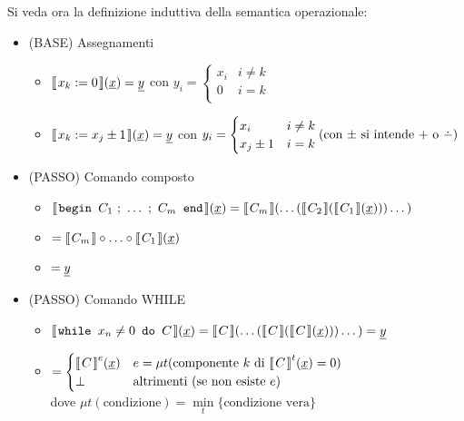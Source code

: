 Si veda ora la definizione induttiva della semantica operazionale:
\begin{itemize}
    \item (BASE) Assegnamenti
        \begin{itemize}
            \item $\opsemWHILE{x_k:=0}{\sottolinea{x}} = \sottolinea{y}$ con
                $y_i = \begin{cases}
                    x_i & i\neq k\\
                    0 & i= k\\
                \end{cases}$
            \item $\opsemWHILE{x_k:=x_j \pm 1}{\sottolinea{x}} = \sottolinea{y}$ con
                $y_i = \begin{cases}
                    x_i & i\neq k\\
                    x_j\pm 1 & i= k\\
                \end{cases} \hfill \text{(con $\pm$ si intende $+$ o $\dotminus$)}$
        \end{itemize}
    \item (PASSO) Comando composto
        \begin{itemize}
            \item $
                \opsemWHILE{\textbegin C_1 \ ; \ \dots \ ; \ C_m\textend}{\sottolinea{x}}
                = \opsemWHILE{C_m}{
                    \dots(
                        \opsemWHILE{C_2}{
                            \opsemWHILE{C_1}{\sottolinea{x}}
                        }
                    )\dots
                }$
            \item[]\hspace{14.1em}$=\opsemWHILEnoP{C_m}\circ\hdots\circ\opsemWHILEnoP{C_1}(\sottolinea{x})$
            \item[]\hspace{14.1em}$=\text{\underline{$y$}}$
        \end{itemize}
    \item (PASSO) Comando WHILE
        \begin{itemize}
            \item $
            \opsemWHILE{\while{x_n} C}{\sottolinea{x}} =
            \opsemWHILE{C}{
                \dots(
                \opsemWHILE{C}{
                    \opsemWHILE{C}{\sottolinea{x}}
                })
                \dots
            }=\sottolinea{y}
            $
            \item[]\hspace{11.7em}$=
                \begin{cases}
                    \opsemWHILEnoP{C}^e(\sottolinea{x}) & e=
                    \mu t(\text{componente $k$ di $\opsemWHILEnoP{C}^t(\sottolinea{x})=0$})\\
                    \perp & \text{altrimenti (se non esiste $e)$}
                \end{cases}
            $
            \\[.6em]dove $\mu t (\text{condizione}) = \underset{t}{\min}\{\text{condizione vera\}}$
        \end{itemize}
\end{itemize}

